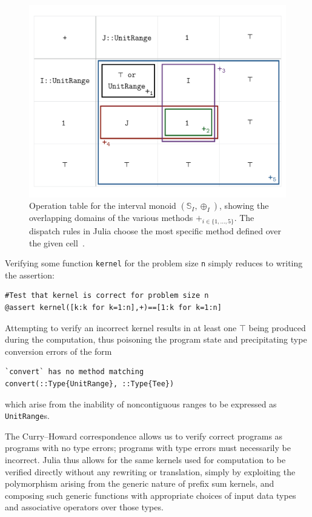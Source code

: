 \documentclass{sig-alternate}
\newcommand{\code}[1]{\texttt{#1}}
\begin{document}
\begin{figure}
  \centering

  \includegraphics[width=.9\columnwidth]{intervaldispatch}
  \caption{Operation table for the interval monoid $(\mathbb S_I, \oplus_I)$,
	  showing the overlapping domains of the various methods
	  $+_{i\in\{1,\dots,5\}}$. The dispatch rules in Julia choose the most
  	  specific method defined over the given cell~\cite{Bezanson2012}.}
  \label{fig:dispatch}
\end{figure}

Verifying some function \code{kernel} for the problem size \code{n} simply
reduces to writing the assertion:

\begin{verbatim}
#Test that kernel is correct for problem size n
@assert kernel([k:k for k=1:n],+)==[1:k for k=1:n]
\end{verbatim}

Attempting to verify an incorrect kernel results in at least one $\top$ being
produced during the computation, thus poisoning the program state and
precipitating type conversion errors of the form

\begin{verbatim}
`convert` has no method matching
convert(::Type{UnitRange}, ::Type{Tee})
\end{verbatim}
%
which arise from the inability of noncontiguous ranges to be expressed as
\code{UnitRange}s. 

The Curry--Howard correspondence allows us to verify correct programs as
programs with no type errors; programs with type errors must necessarily be
incorrect. Julia thus allows for the same kernels used for computation to be
verified directly without any rewriting or translation, simply by exploiting
the polymorphism arising from the generic nature of prefix sum kernels, and
composing such generic functions with appropriate choices of input data types
and associative operators over those types.
\end{document}
